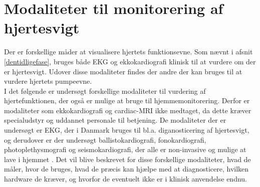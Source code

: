 \section{Modaliteter til monitorering af hjertesvigt}
\textit{}
Der er forskellige måder at visualisere hjertets funktionsevne. Som nævnt i afsnit \ref{dentidligefase}, bruges både EKG og ekkokardiografi klinisk til at vurdere om der er hjertesvigt. Udover disse modaliteter findes der andre der kan bruges til at vurdere hjertets pumpeevne.\\
I det følgende er undersøgt forskellige modaliteter til vurdering af hjertefunktionen, der også er mulige at bruge til hjemmemonitorering. Derfor er modaliteter som ekkokardiografi og cardiac-MRI ikke medtaget, da dette kræver specialudstyr og uddannet personale til betjening. De modaliteter der er undersøgt er EKG, der i Danmark bruges til bl.a. diganosticering af hjertesvigt, og derudover er der undersøgt ballistokardiografi, fonokardiografi, photoplethysmografi og seismokardiografi, der alle er non-invasive og mulige at lave i hjemmet \citep{DCS} \citep{heartfailure} \citep{inan2015} \citep{jain2014}.
Det vil blive beskrevet for disse forskellige modaliteter, hvad de måler, hvor de bruges, hvad de præcis kan hjælpe med at diagnosticere, hvilken hardware de kræver, og hvorfor de eventuelt ikke er i klinisk anvendelse endnu.


